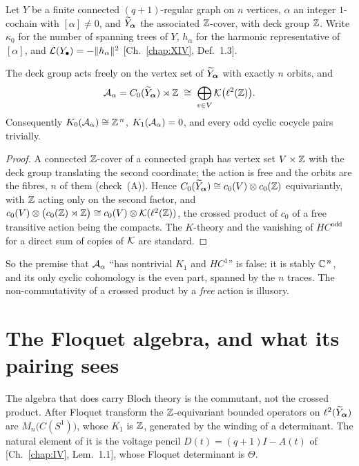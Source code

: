 Let $Y$ be a finite connected $(q+1)$-regular graph on $n$ vertices, $\alpha$ an integer
$1$-cochain with $[\alpha]\ne0$, and $\widetilde Y_{\bm\alpha}$ the associated $\mathbb{Z}$-cover, with deck group
$\mathbb{Z}$. Write $\kappa_0$ for the number of spanning trees of $Y$, $h_\alpha$ for the
harmonic representative of $[\alpha]$, and $\mathcal{L}(Y_\bullet)=-\|h_\alpha\|^2$
[Ch.~\ref{chap:XIV}, Def.~1.3].

\begin{proposition}\label{XIX:prop:compacts}
The deck group acts freely on the vertex set of $\widetilde Y_{\bm\alpha}$ with exactly $n$ orbits, and
\[
\mathcal{A}_\alpha=C_0(\widetilde Y_{\bm\alpha})\rtimes\mathbb{Z}\;\cong\;\bigoplus_{v\in V}\mathcal{K}\bigl(\ell^2(\mathbb{Z})\bigr).
\]
Consequently $K_0(\mathcal{A}_\alpha)\cong\mathbb{Z}^{\,n}$, $K_1(\mathcal{A}_\alpha)=0$, and every odd cyclic
cocycle pairs trivially.
\end{proposition}

\begin{proof}
A connected $\mathbb{Z}$-cover of a connected graph has vertex set $V\times\mathbb{Z}$ with the deck group
translating the second coordinate; the action is free and the orbits are the fibres, $n$
of them (check~(A)). Hence $C_0(\widetilde Y_{\bm\alpha})\cong c_0(V)\otimes c_0(\mathbb{Z})$ equivariantly, with $\mathbb{Z}$
acting only on the second factor, and
$c_0(V)\otimes\bigl(c_0(\mathbb{Z})\rtimes\mathbb{Z}\bigr)\cong c_0(V)\otimes\mathcal{K}(\ell^2(\mathbb{Z}))$, the
crossed product of $c_0$ of a free transitive action being the compacts. The
$K$-theory and the vanishing of $HC^{\mathrm{odd}}$ for a direct sum of copies of $\mathcal{K}$
are standard.
\end{proof}

So the premise that $\mathcal{A}_\alpha$ ``has nontrivial $K_1$ and $HC^1$'' is false: it is stably
$\mathbb{C}^{\,n}$, and its only cyclic cohomology is the even part, spanned by the $n$ traces.
The non-commutativity of a crossed product by a \emph{free} action is illusory.

\section{The Floquet algebra, and what its pairing sees}\label{XIX:sec:floquet}

The algebra that does carry Bloch theory is the commutant, not the crossed product. After
Floquet transform the $\mathbb{Z}$-equivariant bounded operators on $\ell^2(\widetilde Y_{\bm\alpha})$ are
$M_n\bigl(C(S^1)\bigr)$, whose $K_1$ is $\mathbb{Z}$, generated by the winding of a determinant.
The natural element of it is the voltage pencil $D(t)=(q+1)I-A(t)$ of [Ch.~\ref{chap:IV}, Lem.~1.1],
whose Floquet determinant is $\Theta$.

